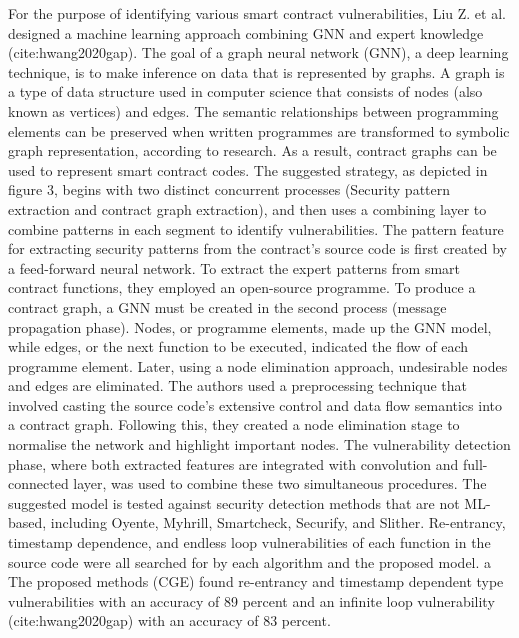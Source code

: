For the purpose of identifying various smart contract vulnerabilities, Liu Z. et al. designed a machine learning approach combining GNN and expert knowledge (cite:hwang2020gap).
The goal of a graph neural network (GNN), a deep learning technique, is to make inference on data that is represented by graphs.
A graph is a type of data structure used in computer science that consists of nodes (also known as vertices) and edges. The semantic relationships between programming elements can be preserved when written programmes are transformed to symbolic graph representation, according to research.
As a result, contract graphs can be used to represent smart contract codes.
The suggested strategy, as depicted in figure 3, begins with two distinct concurrent processes (Security pattern extraction and contract graph extraction), and then uses a combining layer to combine patterns in each segment to identify vulnerabilities.
The pattern feature for extracting security patterns from the contract's source code is first created by a feed-forward neural network.
To extract the expert patterns from smart contract functions, they employed an open-source programme.
To produce a contract graph, a GNN must be created in the second process (message propagation phase).
Nodes, or programme elements, made up the GNN model, while edges, or the next function to be executed, indicated the flow of each programme element.
Later, using a node elimination approach, undesirable nodes and edges are eliminated.
The authors used a preprocessing technique that involved casting the source code's extensive control and data flow semantics into a contract graph.
Following this, they created a node elimination stage to normalise the network and highlight important nodes.
The vulnerability detection phase, where both extracted features are integrated with convolution and full-connected layer, was used to combine these two simultaneous procedures.
The suggested model is tested against security detection methods that are not ML-based, including Oyente, Myhrill, Smartcheck, Securify, and Slither.
Re-entrancy, timestamp dependence, and endless loop vulnerabilities of each function in the source code were all searched for by each algorithm and the proposed model.
a
The proposed methods (CGE) found re-entrancy and timestamp dependent type vulnerabilities with an accuracy of 89 percent and an infinite loop vulnerability (cite:hwang2020gap) with an accuracy of 83 percent.


